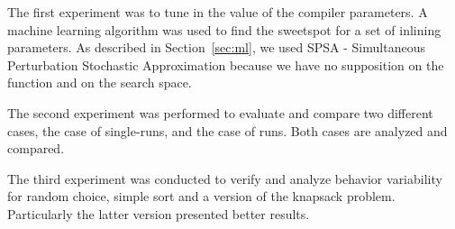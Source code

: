 
\def\graphwidth{0.9\linewidth}



The first experiment was to tune in the value of the compiler parameters.
 A machine learning algorithm was used to find the sweetspot for a set of
 inlining parameters. As described in Section~\ref{sec:ml}, we used
 SPSA - Simultaneous Perturbation Stochastic Approximation because we have no
 supposition on the function and on the search space.

The second experiment was performed to evaluate and compare two different cases,
 the case of single-runs, and the case of \CP\-runs. Both cases are analyzed and
 compared.

The third experiment was conducted to verify and 
  analyze behavior variability for random choice, simple sort and
  a version of the knapsack problem. Particularly the latter version presented better results.

